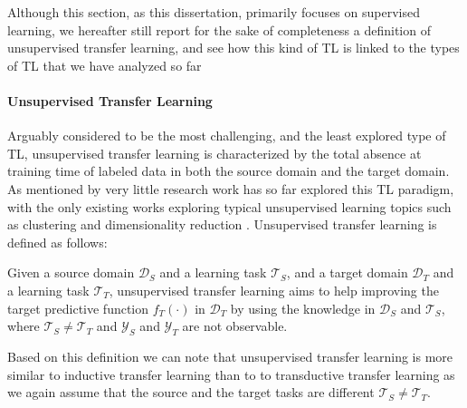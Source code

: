 Although this section, as this dissertation, primarily focuses on supervised learning, we hereafter still report for the sake of completeness a definition of unsupervised transfer learning, and see how this kind of TL is linked to the types of TL that we have analyzed so far

\paragraph{Unsupervised Transfer Learning}
Arguably considered to be the most challenging, and the least explored type of TL, unsupervised transfer learning is characterized by the total absence at training time of labeled data in both the source domain and the target domain. As mentioned by \citet{pan2009survey} very little research work has so far explored this TL paradigm, with the only existing works exploring typical unsupervised learning topics such as clustering \cite{dai2008self, jin2011transferring, qian2015cluster} and dimensionality reduction \cite{wang2008transferred, zhu2013self, zhu2016robust}. Unsupervised transfer learning is defined as follows:
\begin{definition}
	Given a source domain $\mathcal{D}_S$ and a learning task $\mathcal{T}_S$, and a target domain $\mathcal{D}_T$ and a learning task $\mathcal{T}_T$, unsupervised transfer learning aims to help improving the target predictive function $f_T(\cdot)$ in $\mathcal{D}_T$ by using the knowledge in $\mathcal{D}_S$ and $\mathcal{T}_S$, where $\mathcal{T}_S \neq \mathcal{T}_T$ and $\mathcal{Y}_S$ and $\mathcal{Y}_T$ are not observable. 
\end{definition}
Based on this definition we can note that unsupervised transfer learning is more similar to inductive transfer learning than to to transductive transfer learning as we again assume that the source and the target tasks are different $\mathcal{T}_S \neq \mathcal{T}_T$.


